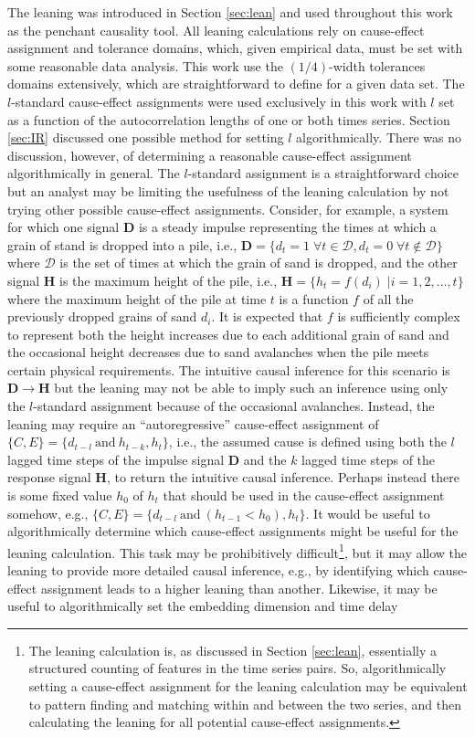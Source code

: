 \documentclass{article}[10pt]
\begin{document}
The leaning was introduced in Section \ref{sec:lean} and used throughout this work as the penchant causality tool.  All leaning calculations rely on cause-effect assignment and tolerance domains, which, given empirical data, must be set with some reasonable data analysis.  This work use the $(1/4)$-width tolerances domains extensively, which are straightforward to define for a given data set.  The $l$-standard cause-effect assignments were used exclusively in this work with $l$ set as a function of the autocorrelation lengths of one or both times series.  Section \ref{sec:IR} discussed one possible method for setting $l$ algorithmically.  There was no discussion, however, of determining a reasonable cause-effect assignment algorithmically in general.  The $l$-standard assignment is a straightforward choice but an analyst may be limiting the usefulness of the leaning calculation by not trying other possible cause-effect assignments.  Consider, for example, a system for which one signal $\mathbf{D}$ is a steady impulse representing the times at which a grain of stand is dropped into a pile, i.e., $\mathbf{D} = \{d_t = 1\; \forall t\in\mathcal{D}, d_t = 0\; \forall t\not\in\mathcal{D}\}$ where $\mathcal{D}$ is the set of times at which the grain of sand is dropped, and the other signal $\mathbf{H}$ is the maximum height of the pile, i.e., $\mathbf{H} = \{h_t = f(d_i)\; |i=1,2,\ldots,t\}$ where the maximum height of the pile at time $t$ is a function $f$ of all the previously dropped grains of sand $d_i$.  It is expected that $f$ is sufficiently complex to represent both the height increases due to each additional grain of sand and the occasional height decreases due to sand avalanches when the pile meets certain physical requirements.  The intuitive causal inference for this scenario is $\mathbf{D}\rightarrow\mathbf{H}$ but the leaning may not be able to imply such an inference using only the $l$-standard assignment because of the occasional avalanches.  Instead, the leaning may require an ``autoregressive'' cause-effect assignment of $\{C,E\} = \{d_{t-l}\mathrm{\ and\ }h_{t-k},h_t\}$, i.e., the assumed cause is defined using both the $l$ lagged time steps of the impulse signal $\mathbf{D}$ and the $k$ lagged time steps of the response signal $\mathbf{H}$, to return the intuitive causal inference.  Perhaps instead there is some fixed value $h_0$ of $h_t$ that should be used in the cause-effect assignment somehow, e.g., $\{C,E\} = \{d_{t-l}\mathrm{\ and\ }(h_{t-1}<h_0),h_t\}$.  It would be useful to algorithmically determine which cause-effect assignments might be useful for the leaning calculation.  This task may be prohibitively difficult\footnote{The leaning calculation is, as discussed in Section \ref{sec:lean}, essentially a structured counting of features in the time series pairs.  So, algorithmically setting a cause-effect assignment for the leaning calculation may be equivalent to pattern finding and matching within and between the two series, and then calculating the leaning for all potential cause-effect assignments.}, but it may allow the leaning to provide more detailed causal inference, e.g., by identifying which cause-effect assignment leads to a higher leaning than another.  Likewise, it may be useful to algorithmically set the embedding dimension and time delay 
\end{document}
